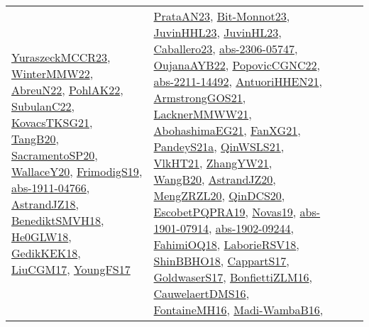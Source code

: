{\begin{longtable}{llp{6cm}p{6cm}p{6cm}}
\href{articles/YuraszeckMCCR23.pdf}{YuraszeckMCCR23}\cite{YuraszeckMCCR23}, \href{papers/WinterMMW22.pdf}{WinterMMW22}\cite{WinterMMW22}, \href{articles/AbreuN22.pdf}{AbreuN22}\cite{AbreuN22}, \href{articles/PohlAK22.pdf}{PohlAK22}\cite{PohlAK22}, \href{articles/SubulanC22.pdf}{SubulanC22}\cite{SubulanC22}, \href{papers/KovacsTKSG21.pdf}{KovacsTKSG21}\cite{KovacsTKSG21}, \href{papers/TangB20.pdf}{TangB20}\cite{TangB20}, \href{articles/SacramentoSP20.pdf}{SacramentoSP20}\cite{SacramentoSP20}, \href{articles/WallaceY20.pdf}{WallaceY20}\cite{WallaceY20}, \href{papers/FrimodigS19.pdf}{FrimodigS19}\cite{FrimodigS19}, \href{articles/abs-1911-04766.pdf}{abs-1911-04766}\cite{abs-1911-04766}, \href{papers/AstrandJZ18.pdf}{AstrandJZ18}\cite{AstrandJZ18}, \href{papers/BenediktSMVH18.pdf}{BenediktSMVH18}\cite{BenediktSMVH18}, \href{papers/He0GLW18.pdf}{He0GLW18}\cite{He0GLW18}, \href{articles/GedikKEK18.pdf}{GedikKEK18}\cite{GedikKEK18}, \href{papers/LiuCGM17.pdf}{LiuCGM17}\cite{LiuCGM17}, \href{papers/YoungFS17.pdf}{YoungFS17}\cite{YoungFS17} & \href{articles/PrataAN23.pdf}{PrataAN23}\cite{PrataAN23}, \href{papers/Bit-Monnot23.pdf}{Bit-Monnot23}\cite{Bit-Monnot23}, \href{papers/JuvinHHL23.pdf}{JuvinHHL23}\cite{JuvinHHL23}, \href{papers/JuvinHL23.pdf}{JuvinHL23}\cite{JuvinHL23}, \href{articles/Caballero23.pdf}{Caballero23}\cite{Caballero23}, \href{articles/abs-2306-05747.pdf}{abs-2306-05747}\cite{abs-2306-05747}, \href{papers/OujanaAYB22.pdf}{OujanaAYB22}\cite{OujanaAYB22}, \href{papers/PopovicCGNC22.pdf}{PopovicCGNC22}\cite{PopovicCGNC22}, \href{articles/abs-2211-14492.pdf}{abs-2211-14492}\cite{abs-2211-14492}, \href{papers/AntuoriHHEN21.pdf}{AntuoriHHEN21}\cite{AntuoriHHEN21}, \href{papers/ArmstrongGOS21.pdf}{ArmstrongGOS21}\cite{ArmstrongGOS21}, \href{papers/LacknerMMWW21.pdf}{LacknerMMWW21}\cite{LacknerMMWW21}, \href{articles/AbohashimaEG21.pdf}{AbohashimaEG21}\cite{AbohashimaEG21}, \href{articles/FanXG21.pdf}{FanXG21}\cite{FanXG21}, \href{articles/PandeyS21a.pdf}{PandeyS21a}\cite{PandeyS21a}, \href{articles/QinWSLS21.pdf}{QinWSLS21}\cite{QinWSLS21}, \href{articles/VlkHT21.pdf}{VlkHT21}\cite{VlkHT21}, \href{articles/ZhangYW21.pdf}{ZhangYW21}\cite{ZhangYW21}, \href{papers/WangB20.pdf}{WangB20}\cite{WangB20}, \href{articles/AstrandJZ20.pdf}{AstrandJZ20}\cite{AstrandJZ20}, \href{articles/MengZRZL20.pdf}{MengZRZL20}\cite{MengZRZL20}, \href{articles/QinDCS20.pdf}{QinDCS20}\cite{QinDCS20}, \href{articles/EscobetPQPRA19.pdf}{EscobetPQPRA19}\cite{EscobetPQPRA19}, \href{articles/Novas19.pdf}{Novas19}\cite{Novas19}, \href{articles/abs-1901-07914.pdf}{abs-1901-07914}\cite{abs-1901-07914}, \href{articles/abs-1902-09244.pdf}{abs-1902-09244}\cite{abs-1902-09244}, \href{articles/FahimiOQ18.pdf}{FahimiOQ18}\cite{FahimiOQ18}, \href{articles/LaborieRSV18.pdf}{LaborieRSV18}\cite{LaborieRSV18}, \href{articles/ShinBBHO18.pdf}{ShinBBHO18}\cite{ShinBBHO18}, \href{papers/CappartS17.pdf}{CappartS17}\cite{CappartS17}, \href{papers/GoldwaserS17.pdf}{GoldwaserS17}\cite{GoldwaserS17}, \href{papers/BonfiettiZLM16.pdf}{BonfiettiZLM16}\cite{BonfiettiZLM16}, \href{papers/CauwelaertDMS16.pdf}{CauwelaertDMS16}\cite{CauwelaertDMS16}, \href{papers/FontaineMH16.pdf}{FontaineMH16}\cite{FontaineMH16}, \href{papers/Madi-WambaB16.pdf}{Madi-WambaB16}\cite{Madi-WambaB16}, 
\end{longtable}}
